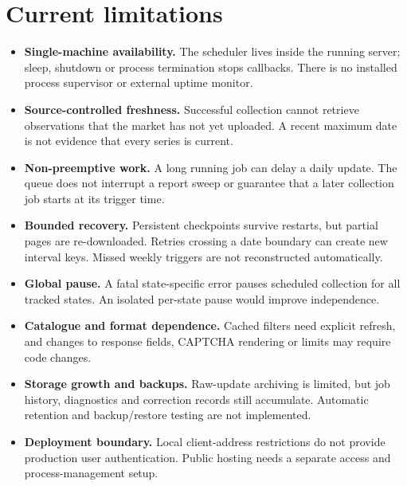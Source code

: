 \documentclass[12pt,a4paper,oneside]{report}
\numberwithin{equation}{chapter}
\numberwithin{figure}{chapter}
\numberwithin{table}{chapter}
\theoremstyle{definition}
\begin{document}
\section{Current limitations}
\begin{itemize}
  \item \textbf{Single-machine availability.} The scheduler lives inside the running server; sleep, shutdown or process termination stops callbacks. There is no installed process supervisor or external uptime monitor.
  \item \textbf{Source-controlled freshness.} Successful collection cannot retrieve observations that the market has not yet uploaded. A recent maximum date is not evidence that every series is current.
  \item \textbf{Non-preemptive work.} A long running job can delay a daily update. The queue does not interrupt a report sweep or guarantee that a later collection job starts at its trigger time.
  \item \textbf{Bounded recovery.} Persistent checkpoints survive restarts, but partial pages are re-downloaded. Retries crossing a date boundary can create new interval keys. Missed weekly triggers are not reconstructed automatically.
  \item \textbf{Global pause.} A fatal state-specific error pauses scheduled collection for all tracked states. An isolated per-state pause would improve independence.
  \item \textbf{Catalogue and format dependence.} Cached filters need explicit refresh, and changes to response fields, CAPTCHA rendering or limits may require code changes.
  \item \textbf{Storage growth and backups.} Raw-update archiving is limited, but job history, diagnostics and correction records still accumulate. Automatic retention and backup/restore testing are not implemented.
  \item \textbf{Deployment boundary.} Local client-address restrictions do not provide production user authentication. Public hosting needs a separate access and process-management setup.
\end{itemize}
\end{document}
